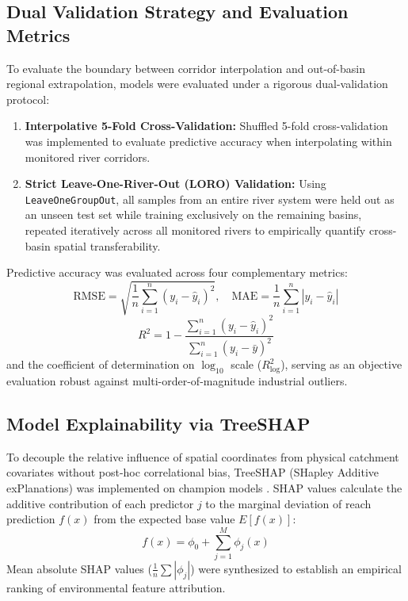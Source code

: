 \documentclass[authoryear,preprint,12pt]{elsarticle}
\begin{document}
\subsection{Dual Validation Strategy and Evaluation Metrics}
To evaluate the boundary between corridor interpolation and out-of-basin regional extrapolation, models were evaluated under a rigorous dual-validation protocol:
\begin{enumerate}
    \item \textbf{Interpolative 5-Fold Cross-Validation:} Shuffled 5-fold cross-validation was implemented to evaluate predictive accuracy when interpolating within monitored river corridors.
    \item \textbf{Strict Leave-One-River-Out (LORO) Validation:} Using \texttt{LeaveOneGroupOut}, all samples from an entire river system were held out as an unseen test set while training exclusively on the remaining basins, repeated iteratively across all monitored rivers to empirically quantify cross-basin spatial transferability.
\end{enumerate}
Predictive accuracy was evaluated across four complementary metrics:
\begin{equation}
\text{RMSE} = \sqrt{\frac{1}{n} \sum_{i=1}^n (y_i - \hat{y}_i)^2}, \quad \text{MAE} = \frac{1}{n} \sum_{i=1}^n |y_i - \hat{y}_i|
\end{equation}
\begin{equation}
R^2 = 1 - \frac{\sum_{i=1}^n (y_i - \hat{y}_i)^2}{\sum_{i=1}^n (y_i - \bar{y})^2}
\end{equation}
and the coefficient of determination on $\log_{10}$ scale ($R^2_{\log}$), serving as an objective evaluation robust against multi-order-of-magnitude industrial outliers.

\subsection{Model Explainability via TreeSHAP}
To decouple the relative influence of spatial coordinates from physical catchment covariates without post-hoc correlational bias, TreeSHAP (SHapley Additive exPlanations) was implemented on champion models \citep{Lundberg2020}. SHAP values calculate the additive contribution of each predictor $j$ to the marginal deviation of reach prediction $f(x)$ from the expected base value $E[f(x)]$:
\begin{equation}
f(x) = \phi_0 + \sum_{j=1}^M \phi_j(x)
\end{equation}
Mean absolute SHAP values ($\frac{1}{n} \sum |\phi_j|$) were synthesized to establish an empirical ranking of environmental feature attribution.
\end{document}
